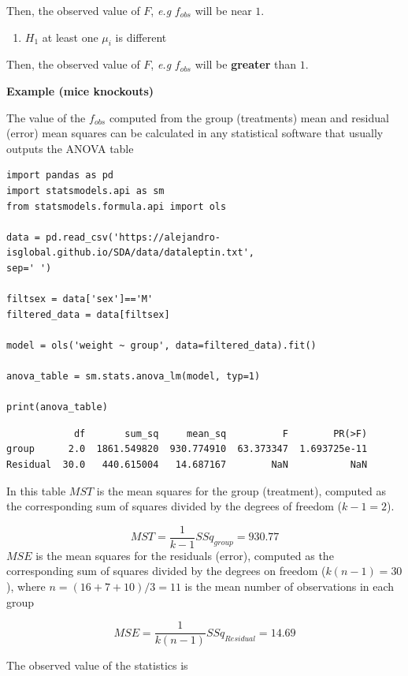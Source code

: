 \documentclass[
]{book}
\providecommand{\tightlist}{%
  \setlength{\itemsep}{0pt}\setlength{\parskip}{0pt}}
\begin{document}
Then, the observed value of \(F\), \emph{e.g} \(f_{obs}\) will be near \(1\).

\begin{enumerate}
\def\labelenumi{\alph{enumi}.}
\setcounter{enumi}{1}
\tightlist
\item
  \(H_1\) at least one \(\mu_i\) is different
\end{enumerate}

Then, the observed value of \(F\), \emph{e.g} \(f_{obs}\) will be \textbf{greater} than \(1\).

\textbf{Example (mice knockouts)}

The value of the \(f_{obs}\) computed from the group (treatments) mean and residual (error) mean squares can be calculated in any statistical software that usually outputs the ANOVA table

\begin{verbatim}
import pandas as pd
import statsmodels.api as sm
from statsmodels.formula.api import ols

data = pd.read_csv('https://alejandro-isglobal.github.io/SDA/data/dataleptin.txt', 
sep=' ')

filtsex = data['sex']=='M'
filtered_data = data[filtsex]

model = ols('weight ~ group', data=filtered_data).fit()

anova_table = sm.stats.anova_lm(model, typ=1)

print(anova_table)
\end{verbatim}

\begin{verbatim}
            df       sum_sq     mean_sq          F        PR(>F)
group      2.0  1861.549820  930.774910  63.373347  1.693725e-11
Residual  30.0   440.615004   14.687167        NaN           NaN
\end{verbatim}

In this table \(MST\) is the mean squares for the group (treatment), computed as the corresponding sum of squares divided by the degrees of freedom (\(k-1=2\)).

\[MST=\frac{1}{k-1}SSq_{group}=930.77\]
\(MSE\) is the mean squares for the residuals (error), computed as the corresponding sum of squares divided by the degrees on freedom (\(k(n-1)=30\)), where \(n=(16 + 7 + 10)/3=11\) is the mean number of observations in each group

\[MSE=\frac{1}{k(n-1)}SSq_{Residual}=14.69\]

The observed value of the statistics is
\end{document}
